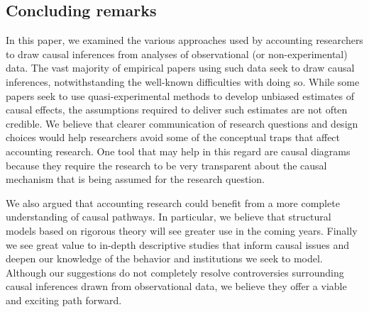\documentclass[12pt,reqno,titlepage]{amsart}
\theoremstyle{definition}
\begin{document}
\begin{doublespace}
\section{Concluding remarks} \label{sec:conclude}
In this paper, we examined the various approaches used by accounting researchers to draw causal inferences from analyses of observational (or non-experimental) data. 
The vast majority of empirical papers using such data seek to draw causal inferences, notwithstanding the well-known difficulties with doing so.
While some papers seek to use quasi-experimental methods to develop unbiased estimates of causal effects, the assumptions required to deliver such estimates are not often credible. 
We believe that clearer communication of research questions and design choices would help researchers avoid some of the conceptual traps that affect 
accounting research.
One tool that may help in this regard are causal diagrams because they require the research to be very transparent about the causal mechanism that is being assumed for the research question.

We also argued that  accounting research could benefit from a more complete understanding of causal pathways. 
In particular, we believe that structural models based on rigorous theory will see greater use in the coming years.
Finally we see great value to in-depth descriptive studies that inform causal issues and deepen our knowledge of the behavior and institutions we seek to model.
Although our suggestions do not completely resolve controversies surrounding causal inferences drawn from observational data, we believe they offer a viable and exciting path forward.

\end{doublespace}

\clearpage


\clearpage
\end{document}
